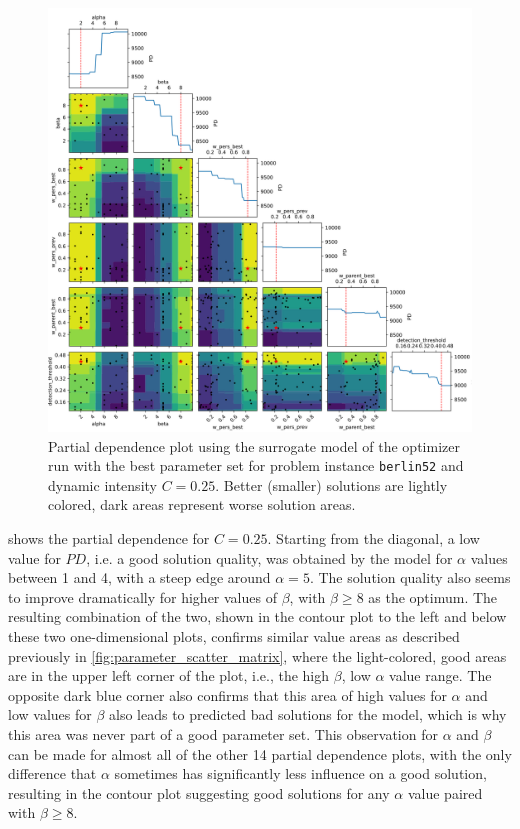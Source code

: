 \begin{figure}[h!]
	\centering
	\centerline{\includegraphics[width=1.2\textwidth]{results/part2/partial_dependence_berlin52_C_0.25_run_4.svg}}
	\caption[Partial dependence plot for \texttt{berlin52} and $C=0.25$]{Partial dependence plot using the surrogate model of the optimizer run with the best parameter set for problem instance \texttt{berlin52} and dynamic intensity $C=0.25$. Better (smaller) solutions are lightly colored, dark areas represent worse solution areas.}
	\label{fig:partial_dependence_berlin52_C_025}
\end{figure}

 shows the partial dependence for $C=0.25$. Starting from the diagonal, a low value for $PD$, i.e. a good solution quality, was obtained by the model for $\alpha$ values between 1 and 4, with a steep edge around $\alpha=5$. The solution quality also seems to improve dramatically for higher values of $\beta$, with $\beta \geq 8$ as the optimum. The resulting combination of the two, shown in the contour plot to the left and below these two one-dimensional plots, confirms similar value areas as described previously in \cref{fig:parameter_scatter_matrix}, where the light-colored, good areas are in the upper left corner of the plot, i.e., the high $\beta$, low $\alpha$ value range. The opposite dark blue corner also confirms that this area of high values for $\alpha$ and low values for $\beta$ also leads to predicted bad solutions for the model, which is why this area was never part of a good parameter set. This observation for $\alpha$ and $\beta$ can be made for almost all of the other 14 partial dependence plots, with the only difference that $\alpha$ sometimes has significantly less influence on a good solution, resulting in the contour plot suggesting good solutions for any $\alpha$ value paired with $\beta \geq 8$.

